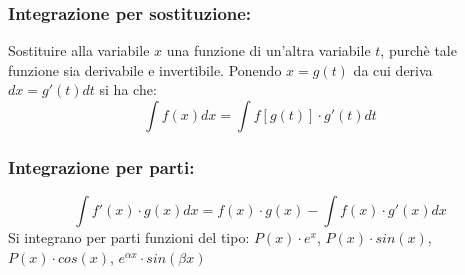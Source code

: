 \documentclass[a4paper, 9pt]{report}
\begin{document}
\subsubsection*{Integrazione per sostituzione:}
Sostituire alla variabile $x$ una funzione di un'altra variabile $t$, purchè tale funzione sia derivabile e invertibile.\newline
Ponendo $x = g(t)$ da cui deriva $dx = g'(t) dt$ si ha che:
\[
    \int f(x) dx = \int f[g(t)] \cdot g'(t) dt
\]
\subsubsection*{Integrazione per parti:}
\[
    \int f'(x) \cdot  g(x) dx = f(x) \cdot g(x) - \int f(x) \cdot g'(x)dx
\]
Si integrano per parti funzioni del tipo:\newline
$P(x) \cdot e^x$, $P(x) \cdot sin(x)$, $P(x) \cdot cos(x)$, $e^{\alpha x} \cdot  sin (\beta x)$
\end{document}
